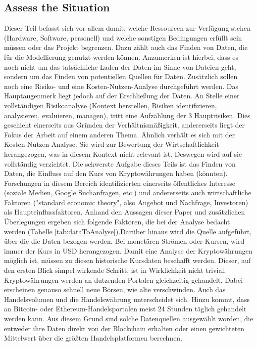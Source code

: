 \subsection{Assess the Situation} \label{subsec:assesTheSituation}
Dieser Teil befasst sich vor allem damit, welche Ressourcen zur Verfügung stehen (Hardware, Software, personell) und welche sonstigen Bedingungen erfüllt sein müssen oder das Projekt begrenzen. Dazu zählt auch das Finden von Daten, die für die Modellierung genutzt werden können. Anzumerken ist hierbei, dass es noch nicht um das tatsächliche Laden der Daten im Sinne von Dateien geht, sondern um das Finden von potentiellen Quellen für Daten. Zusätzlich sollen noch eine Risiko- und eine Kosten-Nutzen-Analyse durchgeführt werden. Das Hauptaugenmerk liegt jedoch auf der Erschließung der Daten. 
\newline
An Stelle einer vollständigen Risikoanalyse (Kontext herstellen, Risiken identifizieren, analysieren, evaluieren, managen\citep[S.~43]{sowa_management_2017}), tritt eine Aufzählung der 3 Hauptrisiken. Dies geschieht einerseits aus Gründen der Verhältnismäßigkeit, andererseits liegt der Fokus der Arbeit auf einem anderen Thema. Ähnlich verhält es sich mit der Kosten-Nutzen-Analyse. Sie wird zur Bewertung der Wirtschaftlichkeit herangezogen, was in diesem Kontext nicht relevant ist. Deswegen wird auf sie vollständig verzichtet.
\newline
Die schwerste Aufgabe dieses Teils ist das Finden von Daten, die Einfluss auf den Kurs von Kryptowährungen haben (könnten). Forschungen in diesem Bereich identifizierten einerseits öffentliches Interesse (soziale Medien, Google Suchanfragen, etc.) und andererseits auch wirtschaftliche Faktoren ("standard economic theory", also Angebot und Nachfrage, Investoren)\citep{kristoufek_what_2015} als Haupteinflussfaktoren. Anhand den Aussagen dieser Paper und zusätzlichen Überlegungen ergeben sich folgende Faktoren, die bei der Analyse bedacht werden (Tabelle \ref{tab:dataToAnalyse}).\newline Darüber hinaus wird die Quelle aufgeführt, über die die Daten bezogen werden. Bei monetären Strömen oder Kursen, wird immer der Kurs in USD herangezogen. 
\newline
Damit eine Analyse der Kryptowährungen möglich ist, müssen zu diesen historische Kursdaten beschafft werden. Dieser, auf den ersten Blick simpel wirkende Schritt, ist in Wirklichkeit  nicht trivial. Kryptowährungen werden an dutzenden Portalen gleichzeitig gehandelt. Dabei erscheinen genauso schnell neue Börsen, wie alte verschwinden. Auch das Handelsvolumen und die Handelswährung unterscheidet sich. Hinzu kommt, dass an Bitcoin- oder Ethereum-Handelsportalen meist 24 Stunden täglich gehandelt werden kann. Aus diesem Grund sind solche Datenquellen ausgewählt worden, die entweder ihre Daten direkt von der Blockchain erhalten oder einen gewichteten Mittelwert über die größten Handelsplatformen berechnen.
